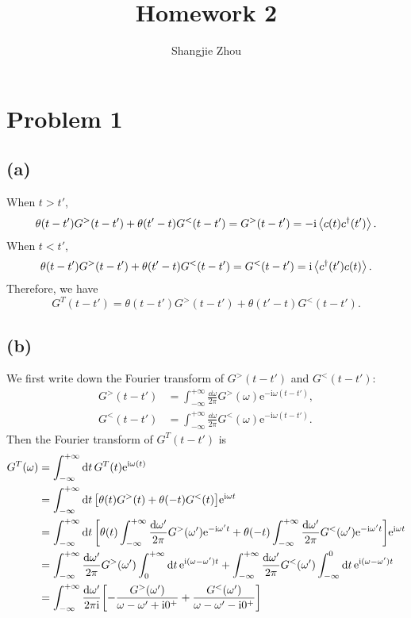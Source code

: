 \documentclass{article}
\title{Homework 2}
\author{Shangjie Zhou}
\newcommand{\ii}{\mathrm{i}}
\newcommand{\me}{\mathrm{e}}
\begin{document}
\maketitle


\section*{Problem 1}
\subsection*{(a)}
When $t>t'$,
\begin{equation}
    \theta(t-t')G^{>}(t-t')+\theta(t'-t)G^{<}(t-t')=G^{>}(t-t')=-\ii\expval{c(t)c^{\dagger}(t')}.
\end{equation}
When $t<t'$,
\begin{equation}
    \theta(t-t')G^{>}(t-t')+\theta(t'-t)G^{<}(t-t')=G^{<}(t-t')=\ii\expval{c^{\dagger}(t')c(t)}.
\end{equation}
Therefore, we have 
\begin{equation}
    G^{T}(t-t')=\theta(t-t')G^{>}(t-t')+\theta(t'-t)G^{<}(t-t').
\end{equation}

\subsection*{(b)}
We first write down the Fourier transform of $G^{>}(t-t')$ and $G^{<}(t-t')$:
\begin{subequations}
    \begin{align}
        G^{>}(t-t')&=\int_{-\infty}^{+\infty}\frac{\dd{\omega}}{2\pi}G^{>}(\omega)\me^{-\ii\omega(t-t')},\\
        G^{<}(t-t')&=\int_{-\infty}^{+\infty}\frac{\dd{\omega}}{2\pi}G^{<}(\omega)\me^{-\ii\omega(t-t')}.
    \end{align}
\end{subequations}
Then the Fourier transform of $G^{T}(t-t')$ is
\begin{equation}
    \begin{split}
        G^{T}(\omega)&=\int_{-\infty}^{+\infty}\dd{t}G^{T}(t)\me^{\ii\omega(t)}\\
        &=\int_{-\infty}^{+\infty}\dd{t}\qty[\theta(t)G^{>}(t)+\theta(-t)G^{<}(t)]\me^{\ii\omega t}\\
        &=\int_{-\infty}^{+\infty}\dd{t}\qty[\theta(t)\int_{-\infty}^{+\infty}\frac{\dd{\omega'}}{2\pi}G^{>}(\omega')\me^{-\ii\omega' t}+\theta(-t)\int_{-\infty}^{+\infty}\frac{\dd{\omega'}}{2\pi}G^{<}(\omega')\me^{-\ii\omega' t}]\me^{\ii\omega t}\\
        &=\int_{-\infty}^{+\infty}\frac{\dd{\omega'}}{2\pi}G^{>}(\omega')\int_{0}^{+\infty}\dd{t}\me^{\ii(\omega-\omega')t}+\int_{-\infty}^{+\infty}\frac{\dd{\omega'}}{2\pi}G^{<}(\omega')\int_{-\infty}^{0}\dd{t}\me^{\ii(\omega-\omega')t}\\
        &=\int_{-\infty}^{+\infty}\frac{\dd{\omega'}}{2\pi\ii}\qty[-\frac{G^{>}(\omega')}{\omega-\omega'+\ii0^{+}}+\frac{ G^{<}(\omega')}{\omega-\omega'-\ii0^{+}}]
    \end{split}
\end{equation}
\end{document}
